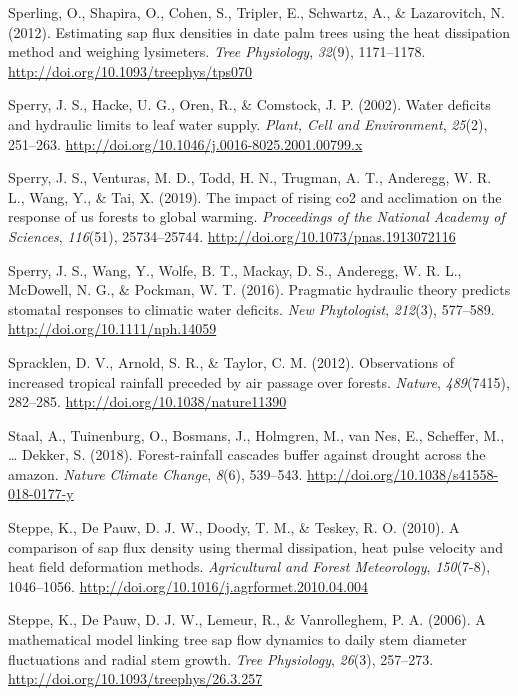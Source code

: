 \documentclass[11pt,twoside]{reedthesis}
\begin{document}
\hypertarget{ref-Sperling2012}{}
Sperling, O., Shapira, O., Cohen, S., Tripler, E., Schwartz, A., \&
Lazarovitch, N. (2012). Estimating sap flux densities in date palm trees
using the heat dissipation method and weighing lysimeters. \emph{Tree
Physiology}, \emph{32}(9), 1171--1178.
\url{http://doi.org/10.1093/treephys/tps070}

\hypertarget{ref-sperry_water_2002}{}
Sperry, J. S., Hacke, U. G., Oren, R., \& Comstock, J. P. (2002). Water
deficits and hydraulic limits to leaf water supply. \emph{Plant, Cell
and Environment}, \emph{25}(2), 251--263.
\url{http://doi.org/10.1046/j.0016-8025.2001.00799.x}

\hypertarget{ref-Sperry2019}{}
Sperry, J. S., Venturas, M. D., Todd, H. N., Trugman, A. T., Anderegg,
W. R. L., Wang, Y., \& Tai, X. (2019). The impact of rising co2 and
acclimation on the response of us forests to global warming.
\emph{Proceedings of the National Academy of Sciences}, \emph{116}(51),
25734--25744. \url{http://doi.org/10.1073/pnas.1913072116}

\hypertarget{ref-sperry_pragmatic_2016}{}
Sperry, J. S., Wang, Y., Wolfe, B. T., Mackay, D. S., Anderegg, W. R.
L., McDowell, N. G., \& Pockman, W. T. (2016). Pragmatic hydraulic
theory predicts stomatal responses to climatic water deficits. \emph{New
Phytologist}, \emph{212}(3), 577--589.
\url{http://doi.org/10.1111/nph.14059}

\hypertarget{ref-Spracklen2012}{}
Spracklen, D. V., Arnold, S. R., \& Taylor, C. M. (2012). Observations
of increased tropical rainfall preceded by air passage over forests.
\emph{Nature}, \emph{489}(7415), 282--285.
\url{http://doi.org/10.1038/nature11390}

\hypertarget{ref-Staal2018}{}
Staal, A., Tuinenburg, O., Bosmans, J., Holmgren, M., van Nes, E.,
Scheffer, M., \ldots{} Dekker, S. (2018). Forest-rainfall cascades
buffer against drought across the amazon. \emph{Nature Climate Change},
\emph{8}(6), 539--543. \url{http://doi.org/10.1038/s41558-018-0177-y}

\hypertarget{ref-Steppe2010}{}
Steppe, K., De Pauw, D. J. W., Doody, T. M., \& Teskey, R. O. (2010). A
comparison of sap flux density using thermal dissipation, heat pulse
velocity and heat field deformation methods. \emph{Agricultural and
Forest Meteorology}, \emph{150}(7-8), 1046--1056.
\url{http://doi.org/10.1016/j.agrformet.2010.04.004}

\hypertarget{ref-Steppe2006}{}
Steppe, K., De Pauw, D. J. W., Lemeur, R., \& Vanrolleghem, P. A.
(2006). A mathematical model linking tree sap flow dynamics to daily
stem diameter fluctuations and radial stem growth. \emph{Tree
Physiology}, \emph{26}(3), 257--273.
\url{http://doi.org/10.1093/treephys/26.3.257}
\end{document}
